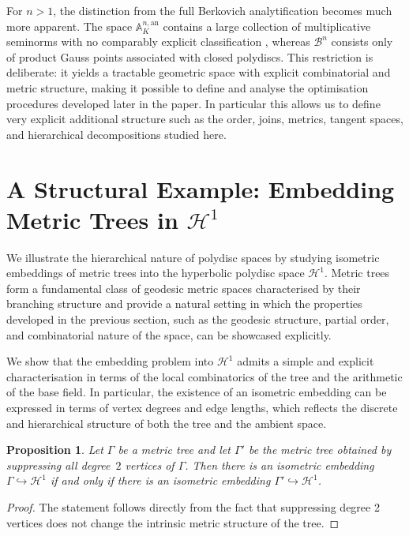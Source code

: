\documentclass[10pt]{article}
\newtheorem{proposition}[theorem]{Proposition}
\theoremstyle{definition}
\begin{document}
For $n>1$, the distinction from the full Berkovich analytification becomes much more apparent. The space $\mathbb A_K^{n,\mathrm{an}}$ contains a large collection of multiplicative seminorms with no comparably explicit classification \cite{jonsson2014}, whereas $\mathcal B^n$ consists only of product Gauss points associated with closed polydiscs. This restriction is deliberate: it yields a tractable geometric space with explicit combinatorial and metric structure, making it possible to define and analyse the optimisation procedures developed later in the paper. In particular this allows us to define very explicit additional structure such as the order, joins, metrics, tangent spaces, and hierarchical decompositions studied here.





\section{A Structural Example: Embedding Metric Trees in $\mathcal{H}^1$}

\label{sec:embedding}
We illustrate the hierarchical nature of polydisc spaces by studying isometric embeddings of metric trees into the hyperbolic polydisc space $\mathcal{H}^1$. Metric trees form a fundamental class of geodesic metric spaces characterised by their branching structure and provide a natural setting in which the properties developed in the previous section, such as the geodesic structure, partial order, and combinatorial nature of the space, can be showcased explicitly.

We show that the embedding problem into $\mathcal{H}^1$ admits a simple and explicit characterisation in terms of the local combinatorics of the tree and the arithmetic of the base field. In particular, the existence of an isometric embedding can be expressed in terms of vertex degrees and edge lengths, which reflects the discrete and hierarchical structure of both the tree and the ambient space.

\begin{proposition}
  \label{prop:metricTreeEmbedding1}
  Let $\Gamma$ be a metric tree and let $\Gamma'$ be the metric tree obtained by suppressing all degree~$2$ vertices of $\Gamma$.  Then there is an isometric embedding $\Gamma\hookrightarrow \mathcal H^1$ if and only if there is an isometric embedding $\Gamma'\hookrightarrow \mathcal H^1$.
\end{proposition}
\begin{proof}
  The statement follows directly from the fact that suppressing degree 2 vertices does not change the intrinsic metric structure of the tree.
\end{proof}
\end{document}
